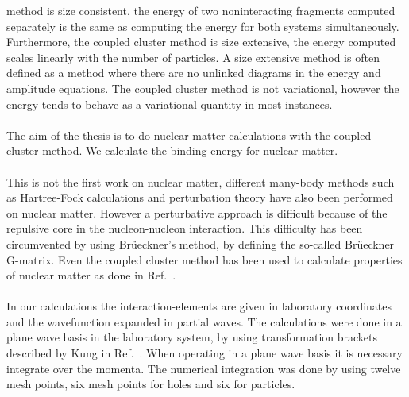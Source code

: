method is size consistent, the energy of two noninteracting fragments computed separately is the same as computing the energy for both systems simultaneously. Furthermore, the coupled cluster method is  size extensive, the energy computed scales linearly with the number of particles. A size extensive method is often defined as a method where there are no unlinked diagrams in the energy and amplitude equations.
The coupled cluster method is not variational, however the energy tends to behave as a variational quantity in most instances.\\
\\
The aim of the thesis is to do nuclear matter calculations with the coupled
cluster method.
We calculate the binding energy for nuclear matter.\\
\\
This is not the first work on nuclear matter, different many-body methods such
as Hartree-Fock calculations and perturbation theory have also been performed on
nuclear matter. However a perturbative approach is difficult because of the
repulsive core in the nucleon-nucleon interaction. This difficulty has been
circumvented by using Br\"ueckner's method, by defining the so-called
Br\"ueckner G-matrix.  Even the coupled cluster method has been used to
calculate properties of nuclear matter as done in Ref.~\cite{dayzab}.\\
\\
In our calculations the interaction-elements are given
in laboratory coordinates and the wavefunction expanded in partial waves.%
The calculations were done in a plane wave basis in the laboratory system, by
using transformation brackets described by Kung in Ref.~\cite{kung}.  When operating in a plane
wave basis it is necessary integrate over the momenta. The numerical integration was done by using twelve mesh points, six mesh points for holes and six for particles.


